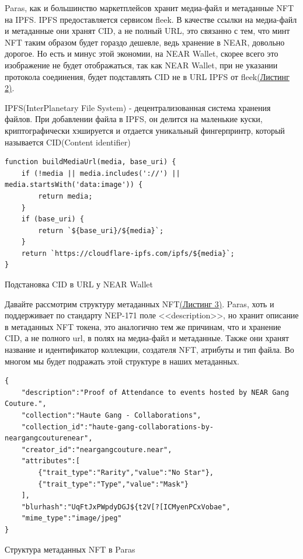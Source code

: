 Paras, как и большинство маркетплейсов хранит медиа-файл и метаданные NFT на IPFS\cite{ipfs}. IPFS предоставляется сервисом fleek\cite{fleek}. В качестве ссылки на медиа-файл и метаданные они хранят CID, а не полный URL, это связанно с тем, что минт NFT таким образом будет гораздо дешевле, ведь хранение в NEAR, довольно дорогое\cite{nearstoragestackinghowmuch}. Но есть и минус этой экономии, на NEAR Wallet, скорее всего это изображение не будет отображаться, так как NEAR Wallet, при не указании протокола соединения, будет подставлять CID не в URL IPFS от fleek\hyperref[lst.pastecidnearwallet]{(Листинг 2)}.

\begin{definition}
    IPFS(InterPlanetary File System) - децентрализованная система хранения файлов. При добавлении файла в IPFS, он делится на маленькие куски, криптографически хэшируется и отдается уникальный фингерпринтр, который называется CID(Content identifier) \cite{ipfs}
\end{definition}

\begin{listing}[H]
\begin{verbatim}
function buildMediaUrl(media, base_uri) {
    if (!media || media.includes('://') || media.startsWith('data:image')) {
        return media;
    }
    if (base_uri) {
        return `${base_uri}/${media}`;
    }
    return `https://cloudflare-ipfs.com/ipfs/${media}`;
}
\end{verbatim}
\caption{Подстановка CID в URL у NEAR Wallet\cite{pastecidnearwallet}}
\label{lst.pastecidnearwallet}
\end{listing}

Давайте рассмотрим структуру метаданных NFT\hyperref[lst.parasnftmetadatastruct]{(Листинг 3)}. Paras, хоть и поддерживает по стандарту NEP-171 поле <<description>>, но хранит описание в метаданных NFT токена, это аналогично тем же причинам, что и хранение CID, а не полного url, в полях на медиа-файл и метаданные. Также они хранят название и идентификатор коллекции, создателя NFT, атрибуты и тип файла. Во многом мы будет подражать этой структуре в наших метаданных.

\begin{listing}[H]
\begin{verbatim}
{
    "description":"Proof of Attendance to events hosted by NEAR Gang Couture.",
    "collection":"Haute Gang - Collaborations",
    "collection_id":"haute-gang-collaborations-by-neargangcouturenear",
    "creator_id":"neargangcouture.near",
    "attributes":[
        {"trait_type":"Rarity","value":"No Star"},
        {"trait_type":"Type","value":"Mask"}
    ],
    "blurhash":"UqFtJxPWpdyDGJ${t2V[?[ICMyenPCxVobae",
    "mime_type":"image/jpeg"
}
\end{verbatim}
\caption{Структура метаданных NFT в Paras}
\label{lst.parasnftmetadatastruct}
\end{listing}


